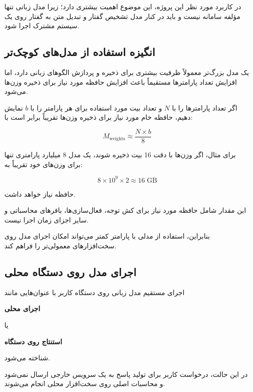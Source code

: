در کاربرد مورد نظر این پروژه، این موضوع اهمیت بیشتری دارد؛
زیرا مدل زبانی تنها مؤلفه سامانه نیست و باید در کنار مدل
تشخیص گفتار و تبدیل متن به گفتار روی یک سیستم مشترک اجرا شود.


\subsection{انگیزه استفاده از مدل‌های کوچک‌تر}

یک مدل بزرگ‌تر معمولاً ظرفیت بیشتری برای ذخیره و پردازش
الگوهای زبانی دارد، اما افزایش تعداد پارامترها مستقیماً باعث
افزایش حافظه مورد نیاز برای ذخیره وزن‌ها می‌شود.

اگر تعداد پارامترها را با $N$ و تعداد بیت مورد استفاده برای
هر پارامتر را با $b$ نمایش دهیم، حافظه خام مورد نیاز برای
ذخیره وزن‌ها تقریباً برابر است با:

\begin{equation}
M_{\mathrm{weights}}
\approx
\frac{N \times b}{8}
\end{equation}

برای مثال، اگر وزن‌ها با دقت 16 بیت ذخیره شوند، یک مدل
8 میلیارد پارامتری تنها برای وزن‌های خود تقریباً به:

\begin{equation}
8 \times 10^9
\times
2
\approx
16 \; \mathrm{GB}
\end{equation}

حافظه نیاز خواهد داشت.

این مقدار شامل حافظه مورد نیاز برای کش توجه، فعال‌سازی‌ها،
بافرهای محاسباتی و سایر اجزای زمان اجرا نیست.

بنابراین، استفاده از مدلی با پارامتر کمتر می‌تواند امکان اجرای
مدل روی سخت‌افزارهای معمولی‌تر را فراهم کند.


\subsection{اجرای مدل روی دستگاه محلی}

اجرای مستقیم مدل زبانی روی دستگاه کاربر با عنوان‌هایی مانند

\textbf{اجرای محلی}

یا

\textbf{استنتاج روی دستگاه}

شناخته می‌شود.

در این حالت، درخواست کاربر برای تولید پاسخ به یک سرویس خارجی
ارسال نمی‌شود و محاسبات اصلی روی سخت‌افزار محلی انجام می‌شوند.

